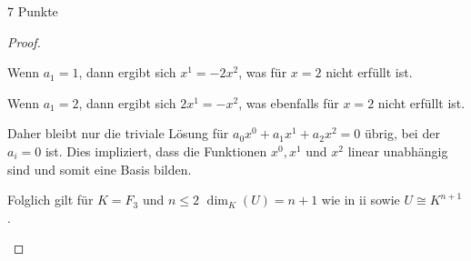\documentclass{../problemset}
\begin{document}
\begin{problem}{7 Punkte}
\begin{proof}
\begin{enumerate}
		      Wenn $a_1 = 1$, dann ergibt sich $x^1 = -2x^2$, was für $x = 2$ nicht erfüllt ist.

		      Wenn $a_1 = 2$, dann ergibt sich $2x^1 = -x^2$, was ebenfalls für $x = 2$ nicht erfüllt ist.

		      Daher bleibt nur die triviale Lösung für $a_0x^0 + a_1x^1 + a_2x^2 = 0$ übrig, bei der $a_i = 0$ ist. Dies impliziert, dass die
		      Funktionen $x^0, x^1$ und $x^2$ linear unabhängig sind und somit eine Basis bilden.

		      Folglich gilt für $K = F_3$ und $n \leq 2$ $\dim_K(U) = n + 1$ wie in ii sowie $U \cong K^{n+1}$.
	\end{enumerate}
\end{proof}

\end{problem}
\end{document}
